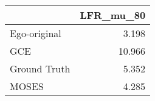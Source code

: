 \begin{tabular}{lr}
\toprule
{} & LFR_mu_80 \\
\midrule
Ego-original &     3.198 \\
GCE          &    10.966 \\
Ground Truth &     5.352 \\
MOSES        &     4.285 \\
\bottomrule
\end{tabular}
